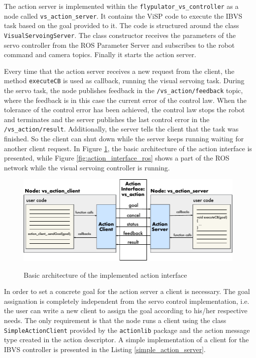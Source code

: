 
The action server is implemented within the \texttt{flypulator\_vs\_controller} as a node called \texttt{vs\_action\_server}. It contains the ViSP code to execute the IBVS task based on the goal provided to it. The code is structured around the class \texttt{VisualServoingServer}. The class constructor receives the parameters of the servo controller from the ROS Parameter Server and subscribes to the robot command and camera topics. Finally it starts the action server.

Every time that the action server receives a new request from the client, the method \texttt{executeCB} is used as callback, running the visual servoing task. During the servo task, the node publishes feedback in the \texttt{/vs\_action/feedback} topic, where the feedback is in this case the current error of the control law. When the tolerance of the control error has been achieved, the control law stops the robot and terminates and the server publishes the last control error in the \texttt{/vs\_action/result}. Additionally, the server tells the client that the task was finished. So the client can shut down while the server keeps running waiting for another client request. In Figure \ref{fig:action_interface}, the basic architecture of the action interface is presented, while Figure \ref{fig:action_interface_ros} shows a part of the ROS network while the visual servoing controller is running.

\begin{figure}[!htb]
	\caption{Basic architecture of the implemented action interface}
	\centering
	\includegraphics[width=\textwidth]{content/chapter_05/images/action_interface.pdf}
	\label{fig:action_interface}
\end{figure}

In order to set a concrete goal for the action server a client is necessary. The goal assignation is completely independent from the servo control implementation, i.e. the user can write a new client to assign the goal according to his/her respective needs. The only requirement is that the node runs a client using the class \texttt{SimpleActionClient} provided by the \texttt{actionlib} package and the action message type created in the action descriptor. A simple implementation of a client for the IBVS controller is presented in the Listing \ref{simple_action_server}.

